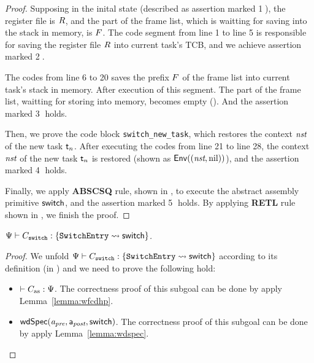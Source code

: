 \begin{proof}
    Supposing in the inital state (described as assertion marked 
    {\color{red} \textcircled{1}}), 
    the register file is $R$, 
    and the part of the frame list, which is waitting for saving into 
    the stack in memory, is $F$. The code segment 
    from line 1 to line 5 is responsible for saving the register file  
    $R$ into current task's TCB, and we achieve assertion 
    marked {\color{red} \textcircled{2}}. 

    The codes from line 6 to 20 saves the prefix $F$ of the 
    frame list into current task's stack in memory. After execution 
    of this segment. The part of the frame list, waitting for storing 
    into memory, becomes empty (\nil). And the assertion marked
    {\color{red} \textcircled{3}} holds.  

    Then, we prove the code block \texttt{switch\_new\_task}, which 
    restores the context $\textit{nst}$ of the new task $\textsf{t}_n$. After 
    executing the codes from line 21 to line 28, the context $\textit{nst}$ of 
    the new task $\textsf{t}_n$ is restored (shown as $\mathsf{Env}({(\textit{nst}, \text{nil})})$), 
    and the assertion marked {\color{red} \textcircled{4}} holds. 

    Finally, we apply \textbf{ABSCSQ} rule, shown in 
    \Fig{\ref{fig:Selected Inference Rules for Refinement Verification}}, 
    to execute the abstract assembly primitive $\mathsf{switch}{}$, and the 
    assertion marked {\color{red} \textcircled{5}} holds. 
    By applying \textbf{RETL} rule shown in 
    \Fig{\ref{fig:Selected Inference Rules for Refinement Verification}}, 
    we finish the proof. 
\end{proof}

\begin{theorem}
    \em
    ${\Psi} \vdash {C_{\texttt{switch}}} : {\{\texttt{SwitchEntry}\rightsquigarrow \mathsf{switch}\}}$. 
\end{theorem}
\begin{proof}
    We unfold 
    ${\Psi} \vdash {C_{\texttt{switch}}} : {\{ \texttt{SwitchEntry}\leadsto \mathsf{switch} \}}$ 
    according to its definition 
    (in \Fig{\ref{fig:Selected Inference Rules for Refinement Verification}}) 
    and we need to prove the following hold:
    \begin{itemize}
        \item $\vdash {C_{\text{as}}} : {\Psi{}}$. \quad 
            The correctness proof of this subgoal can be done by 
            apply Lemma~\ref{lemma:wfcdhp}. 
        \item $\textsf{wdSpec}({\textit{a}_\textit{pre}}, {\mathsf{a}_{\textit{post}}}, {\mathsf{switch}})$. \quad
            The correctness proof of this subgoal can be done by 
            apply Lemma~\ref{lemma:wdspec}.
    \end{itemize}
\end{proof}

